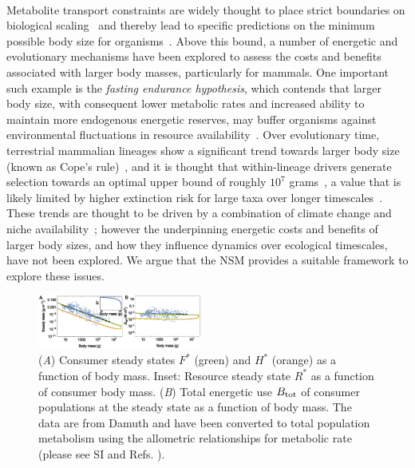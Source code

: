 \documentclass{pnastwo}
\begin{document}
\begin{article}
 \\
Metabolite transport constraints are widely thought to place strict boundaries on biological scaling~\cite{Brown:1993p708,West:1997cg,Brown:2004wq} and thereby lead to specific predictions on the minimum possible body size for organisms~\cite{West:2002ud}.
Above this bound, a number of energetic and evolutionary mechanisms have been explored to assess the costs and benefits associated with larger body masses, particularly for mammals.
One important such example is the \emph{fasting endurance hypothesis}, which contends that larger body size, with consequent lower metabolic rates and increased ability to maintain more endogenous energetic reserves, may buffer organisms against environmental fluctuations in resource availability~\cite{Millar:1990p923}.
Over evolutionary time, terrestrial mammalian lineages show a significant trend towards larger body size (known as Cope's rule)~\cite{Alroy:1998p1594,Clauset:2009fh,Smith:2010p3442,Saarinen:2014br}, and it is thought that within-lineage drivers generate selection towards an optimal upper bound of roughly $10^7$ grams~\cite{Alroy:1998p1594}, a value that is likely limited by higher extinction risk for large taxa over longer timescales~\cite{Clauset:2009fh}.
These trends are thought to be driven by a combination of climate change and niche availability~\cite{Saarinen:2014br}; however the underpinning energetic costs and benefits of larger body sizes, and how they influence dynamics over ecological timescales, have not been explored.
We argue that the NSM provides a suitable framework to explore these issues.



\begin{figure}
\centering
\includegraphics[width=0.48\textwidth]{fig_FPAllometric2.eps}
\caption{\small{ (\emph{A}) Consumer steady states $F^*$ (green) and $H^*$ (orange) as a function of
  body mass. Inset: Resource steady state $R^*$ as a function of consumer body mass.
  (\emph{B}) Total energetic use $B_{\rm tot}$ of consumer populations at the steady state as a function of body mass.
  The data are from Damuth \cite{Damuth:1987kr} and have been converted to total population metabolism using the allometric relationships for metabolic rate (please see SI and Refs. ).}}
\label{fig:mass}
\end{figure}


\end{article}
\end{document}
